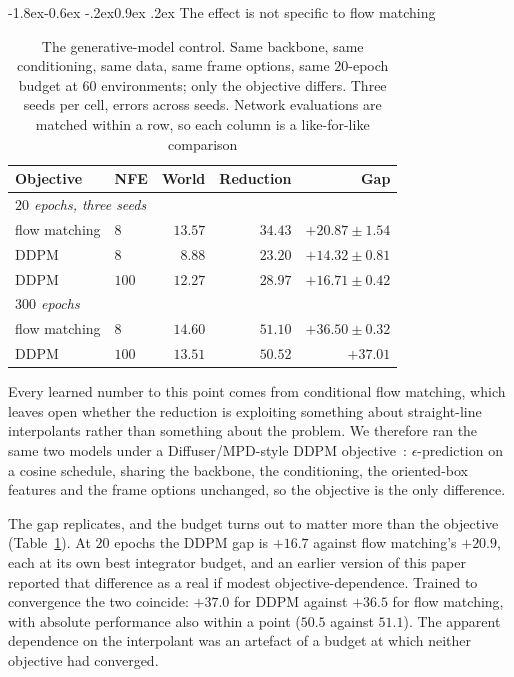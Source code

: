 \documentclass[10pt,twocolumn,letterpaper]{article}
\makeatletter
\newcommand{\toprule}{\hline}
\newcommand{\midrule}{\hline}
\newcommand{\bottomrule}{\hline}
\renewcommand\subsection{\@startsection{subsection}{2}{\z@}%
  {-1.8ex\@plus -0.6ex \@minus -.2ex}{0.9ex \@plus .2ex}%
  {\normalfont\normalsize\bfseries}}
\theoremstyle{plain}
\makeatother
\begin{document}
\subsection{The effect is not specific to flow matching}
\label{sec:objective}

\begin{table}[t]
\centering
\footnotesize
\setlength{\tabcolsep}{4pt}
\begin{tabular}{llrrr}
\toprule
Objective & NFE & World & Reduction & Gap \\
\midrule
\multicolumn{5}{l}{\emph{$20$ epochs, three seeds}}\\
flow matching & $8$   & $13.57$ & $34.43$ & $+20.87\pm1.54$ \\
DDPM          & $8$   & $8.88$  & $23.20$ & $+14.32\pm0.81$ \\
DDPM          & $100$ & $12.27$ & $28.97$ & $+16.71\pm0.42$ \\[2pt]
\multicolumn{5}{l}{\emph{$300$ epochs}}\\
flow matching & $8$   & $14.60$ & $51.10$ & $\mathbf{+36.50\pm0.32}$ \\
DDPM          & $100$ & $13.51$ & $50.52$ & $\mathbf{+37.01}$ \\
\bottomrule
\end{tabular}
\caption{The generative-model control. Same backbone, same conditioning, same
data, same frame options, same $20$-epoch budget at $60$ environments; only the
objective differs. Three seeds per cell, errors across seeds. Network
evaluations are matched within a row, so each column is a like-for-like
comparison}
\label{tab:objective}
\end{table}

Every learned number to this point comes from conditional flow matching, which
leaves open whether the reduction is exploiting something about straight-line
interpolants rather than something about the problem. We therefore ran the same
two models under a Diffuser/MPD-style DDPM objective~\cite{janner2022diffuser,
carvalho2023mpd}: $\epsilon$-prediction on a cosine schedule, sharing the
backbone, the conditioning, the oriented-box features and the frame options
unchanged, so the objective is the only difference.

The gap replicates, and the budget turns out to matter more than the objective
(Table~\ref{tab:objective}). At $20$ epochs the DDPM gap is $+16.7$ against flow
matching's $+20.9$, each at its own best integrator budget, and an earlier
version of this paper reported that difference as a real if modest
objective-dependence. Trained to convergence the two coincide: $+37.0$ for DDPM
against $+36.5$ for flow matching, with absolute performance also within a point
($50.5$ against $51.1$). The apparent dependence on the interpolant was an
artefact of a budget at which neither objective had converged.
\end{document}
